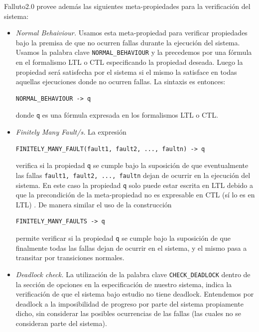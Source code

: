 \documentclass[pdftex,a4paper,12pt]{book}
\begin{document}
Falluto2.0 provee adem\'as las siguientes meta-propiedades para la verificaci\'on del sistema:
\begin{itemize}
\item \textit{Normal Behaiviour.} Usamos esta meta-propiedad para verificar propiedades bajo la premisa de que no ocurren fallas durante la ejecuci\'on del sistema. Usamos la palabra clave \texttt{NORMAL\_BEHAVIOUR} y la precedemos por una f\'ormula en el formalismo LTL o CTL especificando la propiedad deseada. Luego la propiedad ser\'a satisfecha por el sistema si el mismo la satisface en todas aquellas ejecuciones donde no ocurren fallas. La sintaxis es entonces: \begin{verbatim}NORMAL_BEHAVIOUR -> q \end{verbatim} donde \texttt{q} es una f\'ormula expresada en los formalismos LTL o CTL.
\item \textit{Finitely Many Fault/s.} La expresi\'on \begin{verbatim}FINITELY_MANY_FAULT(fault1, fault2, ..., faultn) -> q\end{verbatim} verifica si la propiedad \texttt{q} se cumple bajo la suposici\'on de que eventualmente las fallas \texttt{fault1, fault2, ..., faultn} dejan de ocurrir en la ejecuci\'on del sistema. En este caso la propiedad \texttt{q} solo puede estar escrita en LTL debido a que la precondici\'on de la meta-propiedad no es expresable en CTL (s\'i lo es en LTL) . De manera similar el uso de la construcci\'on \begin{verbatim}FINITELY_MANY_FAULTS -> q \end{verbatim} permite verificar si la propiedad \texttt{q} se cumple bajo la suposici\'on de que finalmente todas las fallas dejan de ocurrir en el sistema, y el mismo pasa a transitar por transiciones normales.
\item \textit{Deadlock check.} La utilizaci\'on de la palabra clave \texttt{CHECK\_DEADLOCK} dentro de la secci\'on de opciones en la especificaci\'on de nuestro sistema, indica la verificaci\'on de que el sistema bajo estudio no tiene deadlock. Entendemos por deadlock a la imposibilidad de progreso por parte del sistema propiamente dicho, sin considerar las posibles ocurrencias de las fallas (las cuales no se consideran parte del sistema).
\end{itemize}
\end{document}
